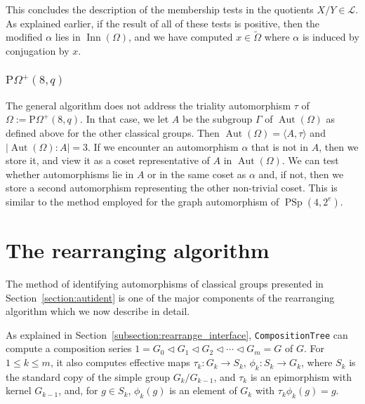 \documentclass[12pt,twoside,reqno,psamsfonts]{amsproc}
\numberwithin{equation}{section}
\numberwithin{figure}{section}
\newcounter{algorithm}
\theoremstyle{plain}
\theoremstyle{definition}
\theoremstyle{remark}
\newcommand{\POm}{\mathrm{P}\Omega}
\DeclareMathOperator{\Aut}{Aut}
\DeclareMathOperator{\Inn}{Inn}
\DeclareMathOperator{\PSp}{PSp}
\begin{document}
\smallskip
This concludes the description of the membership tests in the 
quotients $X/Y \in \mathcal{L}$.
As explained earlier, if the result of all of these tests is positive, then
the modified $\alpha$ lies in $\Inn(\Omega)$, and we have computed 
$x \in \widetilde{\Omega}$ where $\alpha$ is induced by 
conjugation by $x$.

\subsubsection{$\POm^+(8,q)$}\label{triality}
The general algorithm does not address the triality automorphism $\tau$
of $\Omega := \POm^{+}(8,q)$.  In that case, we let $A$ be the subgroup
$\Gamma$ of $\Aut(\Omega)$ as defined above for the other classical groups.
Then $\Aut(\Omega) = \langle A, \tau \rangle$ and $|\Aut(\Omega):A| = 3$.
If we encounter an automorphism $\alpha$ that is not in $A$, then we store it,
and view it as a coset representative of $A$ in $\Aut(\Omega)$.
We can test whether automorphisms lie in $A$ or in the same coset
as $\alpha$ and, if not, then we store a second automorphism representing
the other non-trivial coset.  This is similar to the method 
employed for the graph automorphism of $\PSp(4,2^e)$.


\section{The rearranging algorithm}\label{section:rearrange}
The method of identifying automorphisms of classical groups 
presented in Section~\ref{section:autident}
is one of the major components
of the rearranging algorithm which we now describe in detail.

As explained in Section~\ref{subsection:rearrange_interface},
{\tt CompositionTree} can compute a composition
series $1=G_0 \lhd G_1 \lhd G_2 \lhd \cdots \lhd G_m=G$ of $G$.
For $1 \leqslant k \leqslant m$, it also computes 
effective maps $\tau_k:G_k \to S_k$, $\phi_k:S_k \to G_k$,
where $S_k$ is the standard copy of the simple group $G_k / G_{k - 1}$,
and $\tau_k$ is an epimorphism with kernel $G_{k-1}$,
and, for $g \in S_k$, $\phi_k(g)$ is an element of $G_k$ with
$\tau_k\phi_k(g)=g$.
\end{document}
